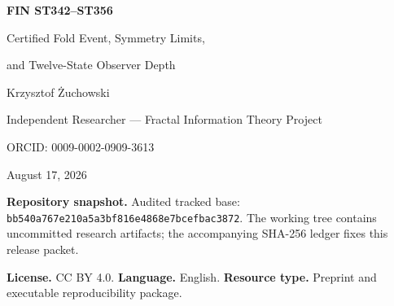 \documentclass[11pt,a4paper]{article}
\begin{document}
\hypersetup{pageanchor=false}
\begin{titlepage}\centering
\vspace*{1cm}{\Large Fractal Information Theory Project\par}\vspace{.8cm}
{\huge\bfseries FIN ST342--ST356\par}\vspace{.35cm}
{\LARGE Certified Fold Event, Symmetry Limits,\par}{\LARGE and Twelve-State Observer Depth\par}
\vspace{.85cm}{\large Local analytical, interval, exact finite, and bounded numerical research\par}
\vfill{\Large Krzysztof \.{Z}uchowski\par}\vspace{.2cm}
{\large Independent Researcher --- Fractal Information Theory Project\par}
{\large ORCID: 0009-0002-0909-3613\par}\vspace{.7cm}
{\large August 17, 2026\par}\vspace{.2cm}{\large Release 10.80\par}\vfill
\begin{minipage}{.92\textwidth}\small
\textbf{Repository snapshot.} Audited tracked base:
\texttt{bb540a767e210a5a3bf816e4868e7bcefbac3872}. The working tree contains
uncommitted research artifacts; the accompanying SHA-256 ledger fixes this release packet.

\medskip\textbf{License.} CC BY 4.0. \quad \textbf{Language.} English. \quad
\textbf{Resource type.} Preprint and executable reproducibility package.
\end{minipage}\end{titlepage}
\hypersetup{pageanchor=true}
\end{document}
